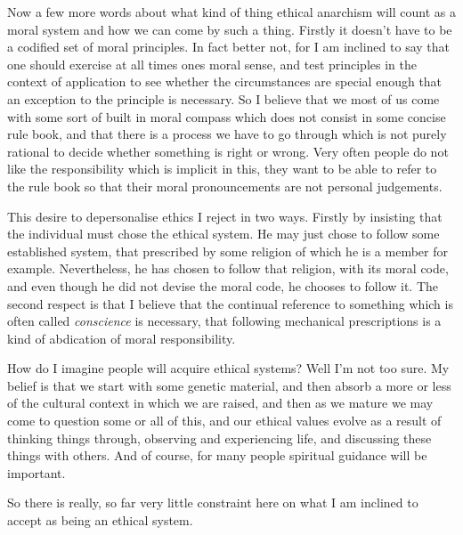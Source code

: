 Now a few more words about what kind of thing ethical anarchism will count as a moral system and how we can come by such a thing.
Firstly it doesn't have to be a codified set of moral principles.
In fact better not, for I am inclined to say that one should exercise at all times ones moral sense, and test principles in the context of application to see whether the circumstances are special enough that an exception to the principle is necessary.
So I believe that we most of us come with some sort of built in moral compass which does not consist in some concise rule book, and that there is a process we have to go through which is not purely rational to decide whether something is right or wrong.
Very often people do not like the responsibility which is implicit in this, they want to be able to refer to the rule book so that their moral pronouncements are not personal judgements.

This desire to depersonalise ethics I reject in two ways.
Firstly by insisting that the individual must chose the ethical system.
He may just chose to follow some established system, that prescribed by some religion of which he is a member for example.
Nevertheless, he has chosen to follow that religion, with its moral code, and even though he did not devise the moral code, he chooses to follow it.
The second respect is that I believe that the continual reference to something which is often called {\it conscience} is necessary, that following mechanical prescriptions is a kind of abdication of moral responsibility.

How do I imagine people will acquire ethical systems?
Well I'm not too sure.
My belief is that we start with some genetic material, and then absorb a more or less of the cultural context in which we are raised, and then as we mature we may come to question some or all of this, and our ethical values evolve as a result of thinking things through, observing and experiencing life, and discussing these things with others.
And of course, for many people spiritual guidance will be important.

So there is really, so far very little constraint here on what I am inclined to accept as being an ethical system.
